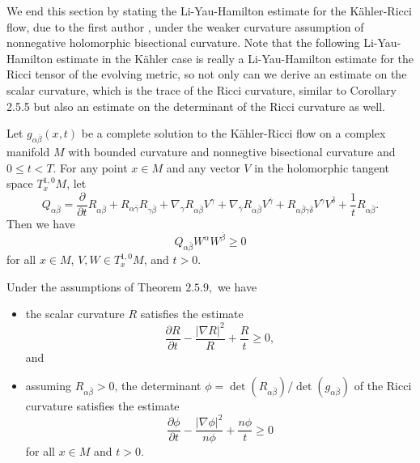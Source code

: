 We end this section by stating the Li-Yau-Hamilton estimate for
the K\"ahler-Ricci flow, due to the first author \cite{Cao92},
under the weaker curvature assumption of nonnegative holomorphic
bisectional curvature. Note that the following Li-Yau-Hamilton
estimate in the K\"ahler case is really a Li-Yau-Hamilton estimate
for the Ricci tensor of the evolving metric, so not only can we
derive an estimate on the scalar curvature, which is the trace of
the Ricci curvature, similar to Corollary 2.5.5 but also an
estimate on the determinant of the Ricci curvature as well.

\begin{theorem}
  \label{thm:cz-kahlerricci-matrix-harnack-estimate}
Let $g_{\alpha\bar \beta}(x,t)$ be a complete solution to the
K\"ahler-Ricci flow on a complex  manifold $M$ with bounded
curvature and nonnegtive bisectional curvature and $0\leq t < T$.
For any point $x\in M$ and any vector $V$ in the holomorphic
tangent space $T^{1,0}_xM$, let
$$
Q_{\alpha\bar \beta}=\frac{\partial}{\partial t}R_{\alpha\bar
\beta}+ R_{\alpha\bar \gamma}R_{\gamma\bar \beta}
+\nabla_{\gamma}R_{\alpha\bar \beta} V^{\gamma}
+\nabla_{\bar\gamma}R_{\alpha\bar
\beta}V^{\bar\gamma}+R_{\alpha\bar \beta\gamma\bar \delta}V^{
\gamma}V^{\bar\delta}+\frac {1}{t}R_{\alpha\bar \beta} .
$$
Then we have
$$
Q_{\alpha\bar \beta}W^{\alpha}W^{\bar \beta}\geq 0
$$
for all $x\in M$, $V, W\in T^{1,0}_xM$, and $t>0$.
\end{theorem}

\begin{corollary}
  \label{cor:cz-kahlerricci-scalar-and-determinant-estimates}
Under the assumptions of Theorem $2.5.9,$ we have
\begin{itemize}
\item[(i)] the scalar curvature $R$ satisfies the estimate
$$
\frac{\partial R}{\partial t}-\frac{|\nabla R|^2}{R}
+\frac{R}{t}\geq 0,$$ and \item[(ii)] assuming $R_{\alpha\bar
\beta}>0$, the determinant
$\phi=\det(R_{\alpha\bar\beta})/\det(g_{\alpha\bar\beta})$ of the
Ricci curvature satisfies the estimate
$$
\frac {\partial \phi}{\partial t}-\frac{|\nabla\phi|^2}{n\phi}
+\frac {n\phi}{t}\geq 0
$$
for all $x\in M$ and $t>0$.
\end{itemize}
\end{corollary}


